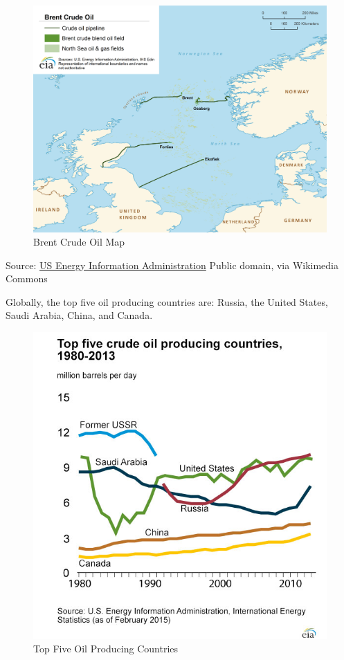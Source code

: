 \documentclass[]{book}
\theoremstyle{definition}
\theoremstyle{definition}
\theoremstyle{remark}
\begin{document}
\begin{figure}[htbp]
\centering
\includegraphics{images/Brent_crude_oil_map (1).png}
\caption{Brent Crude Oil Map}
\end{figure}

Source: \href{http://www.eia.gov/countries/cab.cfm?fips=UK}{US Energy
Information Administration} Public domain, via Wikimedia Commons

Globally, the top five oil producing countries are: Russia, the United
States, Saudi Arabia, China, and Canada.

\begin{figure}[htbp]
\centering
\includegraphics{images/top_petroleum_producing_countries-large.jpg}
\caption{Top Five Oil Producing Countries}
\end{figure}
\end{document}

